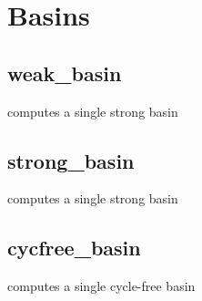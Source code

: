 \documentclass[letterpaper,10pt,english]{sphinxmanual}
\begin{document}
\section{Basins}
\label{\detokenize{Basins:basins}}\label{\detokenize{Basins::doc}}\label{\detokenize{Basins:id1}}

\subsection{weak\_basin}
\label{\detokenize{Basins:weak-basins}}\label{\detokenize{Basins:weak-basin}}

\begin{fulllineitems}
\label{\detokenize{Basins:PyBoolNet.Basins.weak_basin}}
computes a single strong basin

\end{fulllineitems}



\subsection{strong\_basin}
\label{\detokenize{Basins:id2}}\label{\detokenize{Basins:strong-basin}}

\begin{fulllineitems}
\label{\detokenize{Basins:PyBoolNet.Basins.strong_basin}}
computes a single strong basin

\end{fulllineitems}



\subsection{cycfree\_basin}
\label{\detokenize{Basins:cycfree-basin}}\label{\detokenize{Basins:id3}}

\begin{fulllineitems}
\label{\detokenize{Basins:PyBoolNet.Basins.cycfree_basin}}
computes a single cycle-free basin

\end{fulllineitems}
\end{document}
